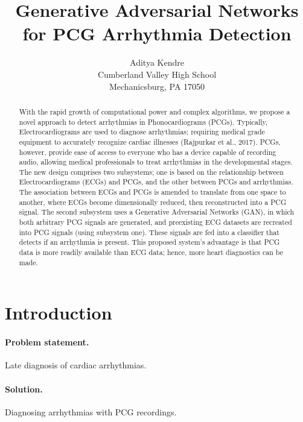 \documentclass{article}
\title{Generative Adversarial Networks for PCG Arrhythmia Detection}
\author{
 Aditya Kendre \\
  Cumberland Valley High School\\
  Mechanicsburg, PA 17050 \\
}
\begin{document}
\maketitle
\begin{abstract}
With the rapid growth of computational power and complex algorithms, we propose a novel approach to detect arrhythmias in Phonocardiograms (PCGs). Typically, Electrocardiograms are used to diagnose arrhythmias; requiring medical grade equipment to accurately recognize cardiac illnesses (Rajpurkar et al., 2017). PCGs, however, provide ease of access to everyone who has a device capable of recording audio, allowing medical professionals to treat arrhythmias in the developmental stages. The new design comprises two subsystems; one is based on the relationship between Electrocardiograms (ECGs) and PCGs, and the other between PCGs and arrhythmias. The association between ECGs and PCGs is amended to translate from one space to another, where ECGs become dimensionally reduced, then reconstructed into a PCG signal. The second subsystem uses a Generative Adversarial Networks (GAN), in which both arbitrary PCG signals are generated, and preexisting ECG datasets are recreated into PCG signals (using subsystem one). These signals are fed into a classifier that detects if an arrhythmia is present. This proposed system's advantage is that PCG data is more readily available than ECG data; hence, more heart diagnostics can be made.
\end{abstract}

\section{Introduction}
\paragraph{Problem statement.}
Late diagnosis of cardiac arrhythmias.
\paragraph{Solution.}
Diagnosing arrhythmias with PCG recordings.
\end{document}
